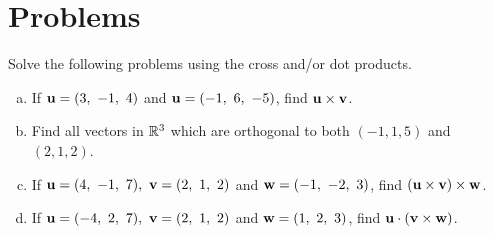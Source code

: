 
\section*{Problems}


    
 
\begin{prob}\label{prob03.1}  Solve the following problems using the cross and/or dot products.\medskip
\begin{enumerate}[a)]
\item If $\mathbf{u}=(3,\ -1,\ 4)$ and $\mathbf{u}=(-1,\ 6,\ -5)$, find
$\mathbf{u}\times \mathbf{v}$. \medskip
\item\sov Find all vectors in $\mathbb{R}^3$ which are orthogonal to both  $(-1, 1, 5)$ and $(2, 1, 2)$.  \medskip
\item  If $\uu=(4,\ -1,\ 7),\ \vv=(2,\ 1,\ 2)$ and 
$\mathbf{w}=(-1,\ -2,\ 3)$, find $(\mathbf{u}\times \mathbf{v})\times \mathbf{w}$. \medskip
\item\sov If $\uu=(-4,\ 2,\ 7),\ \vv=(2,\ 1,\ 2)$ and 
$\mathbf{w}=(1,\ 2,\ 3)$, find $\mathbf{u}\cdot (\mathbf{v}\times \mathbf{w})$. \medskip
\end{enumerate}

\end{prob}
